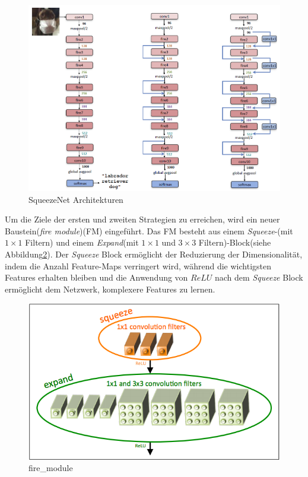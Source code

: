 \documentclass[12pt,a4paper]{scrartcl}
\numberwithin{equation}{section}
\begin{document}
\begin{figure}[h]
	\centering
	\includegraphics[width=\textwidth ]{squeezenet}
	\caption{ SqueezeNet Architekturen \cite{SqueezeNet} }
	\label{fig:SqueezeNet}
\end{figure}

Um die Ziele der ersten und zweiten Strategien zu erreichen, wird ein neuer Baustein(\textit{fire module})(FM) eingeführt. Das FM besteht aus einem \textit{Squeeze}-(mit $ 1\times1 $ Filtern) und einem \textit{Expand}(mit $ 1\times1 $ und $ 3\times3 $ Filtern)-Block(siehe Abbildung\ref{fig:fire_module}). Der \textit{Squeeze} Block ermöglicht der Reduzierung der Dimensionalität, indem die Anzahl Feature-Maps verringert wird, während die wichtigsten Features erhalten bleiben und die Anwendung von $ ReLU $ nach dem \textit{Squeeze} Block ermöglicht dem Netzwerk, komplexere Features zu lernen.

\begin{figure}[h]
	\centering
	\includegraphics[width=\textwidth ]{fire_module}
	\caption{ fire\_module \cite{SqueezeNet} }
	\label{fig:fire_module}
\end{figure}
\end{document}
